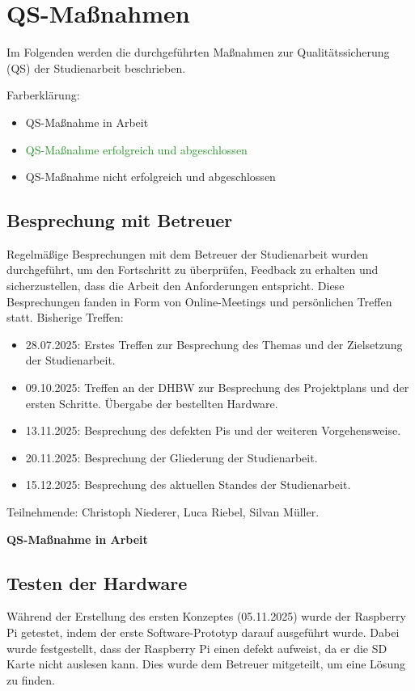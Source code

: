 \chapter{QS-Maßnahmen}
Im Folgenden werden die durchgeführten Maßnahmen zur Qualitätssicherung (QS) der Studienarbeit beschrieben.

Farberklärung:
\begin{itemize}
    \item {\textcolor{yellow!80!brown}{QS-Maßnahme in Arbeit}}
    \item {\textcolor{ForestGreen}{QS-Maßnahme erfolgreich und abgeschlossen}}
    \item {\textcolor{red!80!black}{QS-Maßnahme nicht erfolgreich und abgeschlossen}}
\end{itemize}
\section{Besprechung mit Betreuer}
Regelmäßige Besprechungen mit dem Betreuer der Studienarbeit wurden durchgeführt, um den Fortschritt zu überprüfen, Feedback zu erhalten und sicherzustellen, dass die Arbeit den Anforderungen entspricht. Diese Besprechungen fanden in Form von Online-Meetings und persönlichen Treffen statt.
Bisherige Treffen: 
\begin{itemize}
    \item 28.07.2025: Erstes Treffen zur Besprechung des Themas und der Zielsetzung der Studienarbeit.
    \item 09.10.2025: Treffen an der DHBW zur Besprechung des Projektplans und der ersten Schritte. Übergabe der bestellten Hardware.
    \item 13.11.2025: Besprechung des defekten Pis und der weiteren Vorgehensweise.
    \item 20.11.2025: Besprechung der Gliederung der Studienarbeit.
    \item 15.12.2025: Besprechung des aktuellen Standes der Studienarbeit.
\end{itemize}

Teilnehmende: Christoph Niederer, Luca Riebel, Silvan Müller.

\textcolor{yellow!80!brown}{\textbf{QS-Maßnahme in Arbeit}}
\section{Testen der Hardware}
Während der Erstellung des ersten Konzeptes (05.11.2025) wurde der Raspberry Pi getestet, indem der erste Software-Prototyp darauf ausgeführt wurde. Dabei wurde festgestellt, dass der Raspberry Pi einen defekt aufweist, da er die SD Karte nicht auslesen kann. Dies wurde dem Betreuer mitgeteilt, um eine Lösung zu finden.

